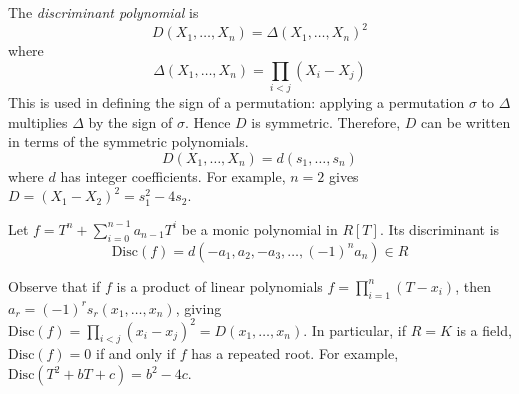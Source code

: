 \begin{example}
	The \emph{discriminant polynomial} is
	\[ D(X_1, \dots, X_n) = \Delta(X_1, \dots, X_n)^2 \]
	where
	\[ \Delta(X_1, \dots, X_n) = \prod_{i < j} (X_i - X_j) \]
	This is used in defining the sign of a permutation: applying a permutation \( \sigma \) to \( \Delta \) multiplies \( \Delta \) by the sign of \( \sigma \).
	Hence \( D \) is symmetric.
	Therefore, \( D \) can be written in terms of the symmetric polynomials.
	\[ D(X_1, \dots, X_n) = d(s_1, \dots, s_n) \]
	where \( d \) has integer coefficients.
	For example, \( n = 2 \) gives \( D = (X_1 - X_2)^2 = s_1^2 - 4s_2 \).
\end{example}
\begin{definition}
	Let \( f = T^n + \sum_{i=0}^{n-1} a_{n-1} T^i \) be a monic polynomial in \( R[T] \).
	Its discriminant is
	\[ \mathrm{Disc}(f) = d(-a_1, a_2, -a_3, \dots, (-1)^n a_n) \in R \]
\end{definition}
Observe that if \( f \) is a product of linear polynomials \( f = \prod_{i=1}^n (T - x_i) \), then \( a_r = (-1)^r s_r(x_1, \dots, x_n) \), giving \( \mathrm{Disc}(f) = \prod_{i < j} (x_i - x_j)^2 = D(x_1, \dots, x_n) \).
In particular, if \( R = K \) is a field, \( \mathrm{Disc}(f) = 0 \) if and only if \( f \) has a repeated root.
For example, \( \mathrm{Disc}(T^2 + bT + c) = b^2 - 4c \).
